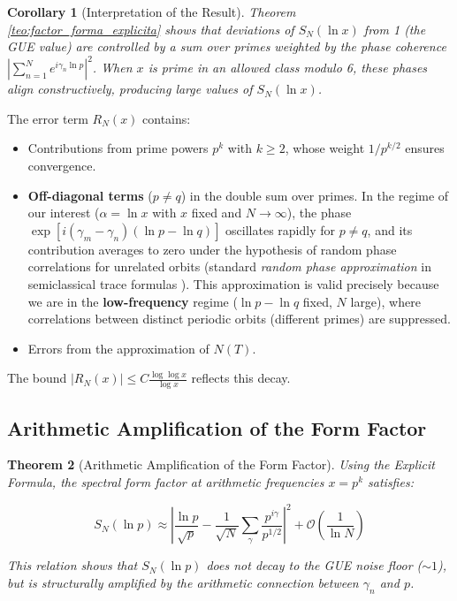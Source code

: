 \documentclass[12pt, a4paper]{article}
\theoremstyle{plain}
\newtheorem{teorema}{Theorem}[section]
\newtheorem{corolario}[teorema]{Corollary}
\theoremstyle{definition}
\theoremstyle{remark}
\begin{document}
\begin{corolario}[Interpretation of the Result]
Theorem \ref{teo:factor_forma_explicita} shows that deviations of $S_N(\ln x)$ from 1 (the GUE value) are controlled by a sum over primes weighted by the phase coherence $\left| \sum_{n=1}^N e^{i\gamma_n \ln p} \right|^2$. When $x$ is prime in an allowed class modulo 6, these phases align constructively, producing large values of $S_N(\ln x)$.
\end{corolario}

The error term $R_N(x)$ contains:
\begin{itemize}
    \item Contributions from prime powers $p^k$ with $k \geq 2$, whose weight $1/p^{k/2}$ ensures convergence.
    \item \textbf{Off-diagonal terms} ($p \neq q$) in the double sum over primes. In the regime of our interest ($\alpha = \ln x$ with $x$ fixed and $N \to \infty$), the phase $\exp[i(\gamma_m - \gamma_n)(\ln p - \ln q)]$ oscillates rapidly for $p \neq q$, and its contribution averages to zero under the hypothesis of random phase correlations for unrelated orbits (standard \textit{random phase approximation} in semiclassical trace formulas \cite{berry1985}). This approximation is valid precisely because we are in the \textbf{low-frequency} regime ($\ln p - \ln q$ fixed, $N$ large), where correlations between distinct periodic orbits (different primes) are suppressed.
    \item Errors from the approximation of $N(T)$.
\end{itemize}
The bound $|R_N(x)| \leq C \frac{\log\log x}{\log x}$ reflects this decay.

\subsection{Arithmetic Amplification of the Form Factor}
\label{subsec:amplificacion_aritmetica}

\begin{teorema}[Arithmetic Amplification of the Form Factor]
\label{teo:amplificacion_aritmetica}
Using the Explicit Formula, the spectral form factor at arithmetic 
frequencies $x = p^k$ satisfies:

\[
S_N(\ln p) \approx \left| \frac{\ln p}{\sqrt{p}} - \frac{1}{\sqrt{N}}\sum_{\gamma} \frac{p^{i\gamma}}{p^{1/2}} \right|^2 + \mathcal{O}\left(\frac{1}{\ln N}\right)
\]

This relation shows that $S_N(\ln p)$ does not decay to the GUE noise floor ($\sim 1$), 
but is structurally amplified by the arithmetic connection between 
$\gamma_n$ and $p$.
\end{teorema}
\end{document}
